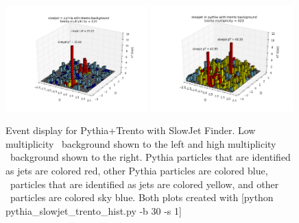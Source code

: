 \documentclass[11pt]{article}
\begin{document}
\begin{figure}[h]
\begin{center}
\includegraphics[width=0.49\textwidth]{pythia_slowjet_trento_hist1.png}
\includegraphics[width=0.49\textwidth]{pythia_slowjet_trento_hist2.png}
\label{fig_label}
\caption{Event display for Pythia+Trento with SlowJet Finder. Low multiplicity \trento\ background shown to the left and high multiplicity \trento\ background shown to the right. Pythia particles that are identified as jets are colored red, other Pythia particles are colored blue, \trento\ particles that are identified as jets are colored yellow, and other \trento\ particles are colored sky blue. Both plots created with [python pythia\_slowjet\_trento\_hist.py -b 30 -s 1]}
\end{center}
\end{figure}
\end{document}

